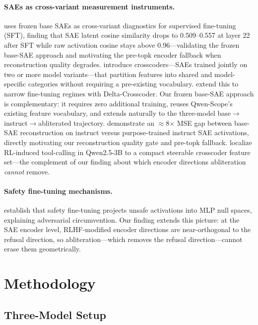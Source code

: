 \documentclass[11pt,letterpaper]{article}
\begin{document}
\paragraph{SAEs as cross-variant measurement instruments.}
\citet{Chopra2026} uses frozen base SAEs as cross-variant diagnostics for supervised fine-tuning
(SFT), finding that SAE latent cosine similarity drops to 0.509--0.557 at layer 22 after SFT while
raw activation cosine stays above 0.96---validating the frozen base-SAE approach and motivating the
pre-topk encoder fallback when reconstruction quality degrades. \citet{Jiralerspong2026} introduce
crosscoders---SAEs trained jointly on two or more model variants---that partition features into shared
and model-specific categories without requiring a pre-existing vocabulary. \citet{Kassem2026} extend
this to narrow fine-tuning regimes with Delta-Crosscoder. Our frozen base-SAE approach is
complementary: it requires zero additional training, reuses Qwen-Scope's existing feature vocabulary,
and extends naturally to the three-model base$\to$instruct$\to$abliterated trajectory. \citet{Li2025}
demonstrate an $\approx$8$\times$ MSE gap between base-SAE reconstruction on instruct versus
purpose-trained instruct SAE activations, directly motivating our reconstruction quality gate and
pre-topk fallback. \citet{Shportko2026} localize RL-induced tool-calling in Qwen2.5-3B to a compact
steerable crosscoder feature set---the complement of our finding about which encoder directions
abliteration \emph{cannot} remove.

\paragraph{Safety fine-tuning mechanisms.}
\citet{Jain2024} establish that safety fine-tuning projects unsafe activations into MLP null spaces,
explaining adversarial circumvention. Our finding extends this picture: at the SAE encoder level,
RLHF-modified encoder directions are near-orthogonal to the refusal direction, so abliteration---which
removes the refusal direction---cannot erase them geometrically.

\section{Methodology}

\subsection{Three-Model Setup}
\label{sec:setup}
\end{document}
